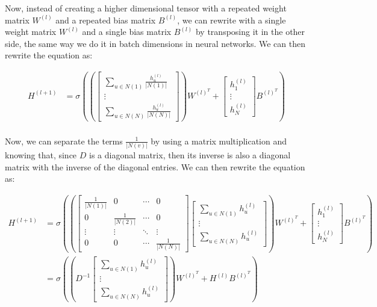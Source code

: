 \documentclass{article}
\begin{document}
Now, instead of creating a higher dimensional tensor with a repeated weight matrix $W^{(l)}$ and a repeated bias matrix $B^{(l)}$,
we can rewrite with a single weight matrix $W^{(l)}$ and a single bias matrix $B^{(l)}$ by transposing it in the other side,
the same way we do it in batch dimensions in neural networks. We can then rewrite the equation as:

\begin{align*}
    H^{(l+1)} & = \sigma \left(  \left( \begin{bmatrix}
        \sum_{u \in N(1)} \frac{h_u^{(l)}}{|N(1)|} \\
        \vdots \\
        \sum_{u \in N(N)} \frac{h_u^{(l)}}{|N(N)|}
    \end{bmatrix} \right) W^{(l)^T} +  \begin{bmatrix}
        h_1^{(l)} \\
        \vdots \\
        h_N^{(l)}
    \end{bmatrix}
    B^{(l)^T}
    \right) \\
\end{align*}

Now, we can separate the terms $\frac{1}{|N(v)|}$ by using a matrix multiplication and knowing that, since $D$ is a diagonal matrix,
then its inverse is also a diagonal matrix with the inverse of the diagonal entries. We can then rewrite the equation as:

\begin{align*}
    H^{(l+1)} & = \sigma \left( \left(
        \begin{bmatrix}
            \frac{1}{|N(1)|} & 0 & \cdots & 0 \\
            0 & \frac{1}{|N(2)|} & \cdots & 0 \\
            \vdots & \vdots & \ddots & \vdots \\
            0 & 0 & \cdots & \frac{1}{|N(N)|}
        \end{bmatrix}
        \begin{bmatrix}
        \sum_{u \in N(1)} h_u^{(l)} \\
        \vdots \\
        \sum_{u \in N(N)} h_u^{(l)}
    \end{bmatrix} \right) W^{(l)^T} + \begin{bmatrix}
        h_1^{(l)} \\
        \vdots \\
        h_N^{(l)}
    \end{bmatrix} B^{(l)^T}
    \right) \\
    &=
    \sigma \left( \left(
        D^{-1}
        \begin{bmatrix}
            \sum_{u \in N(1)} h_u^{(l)} \\
            \vdots \\
            \sum_{u \in N(N)} h_u^{(l)}
        \end{bmatrix} \right) W^{(l)^T} + H^{(l)} B^{(l)^T}
    \right) \\
\end{align*}
\end{document}
